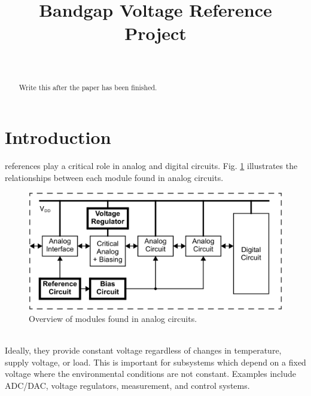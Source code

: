 \documentclass[conference]{IEEEtran}
\begin{document}
%
\title{Bandgap Voltage Reference Project}

\author{
\\
\and
{}
\and
{}
}

\maketitle

\begin{abstract}
Write this after the paper has been finished.
\end{abstract}
\IEEEpeerreviewmaketitle

\section{Introduction}
 references play a critical role in analog and digital circuits.  Fig. \ref{fig:overview} illustrates the relationships between each module found in analog circuits.
\begin{figure}[!htbp]
  \centering
  \includegraphics[scale=0.25]{images/overview.png}
  \caption[Overview]{Overview of modules found in analog circuits.\footnotemark}
  \label{fig:overview}
\end{figure}
\\Ideally, they provide constant voltage regardless of changes in temperature, supply voltage, or load.  This is important for subsystems which depend on a fixed voltage where the environmental conditions are not constant.  Examples include ADC/DAC, voltage regulators, measurement, and control systems.
\end{document}
